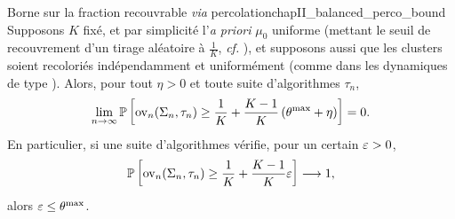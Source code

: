 \begin{Theoreme}{Borne sur la fraction recouvrable \emph{via} percolation}{chapII_balanced_perco_bound}
Supposons $K$ fixé, et par simplicité l'\emph{a priori} $\mu_0$ uniforme (mettant le seuil de recouvrement d'un tirage aléatoire à $\frac1K$, \emph{cf.} ), et supposons aussi que les clusters soient recoloriés indépendamment et uniformément (comme dans les dynamiques de type \SW{}). Alors, pour tout $\eta>0$ et toute suite d'algorithmes $\tau_n$,
\begin{equation}
    \lim_{n\to\infty}
    \mathbb P\left[
        \operatorname{ov}_n(\Sigma_n,\tau_n)
        \ge
        \frac1K+\frac{K-1}{K}\left(\theta^{\max}+\eta\right)
    \right]
    =0.
    \label{eq:chapII_balanced_perco_bound_proba}
\end{equation}
En particulier, si une suite d'algorithmes vérifie, pour un certain $\varepsilon>0$,
\begin{equation}
    \mathbb P\left[
        \operatorname{ov}_n(\Sigma_n,\tau_n)
        \ge
        \frac1K+\frac{K-1}{K}\varepsilon
    \right]\longrightarrow1,
    \label{eq:chapII_eps_recovery}
\end{equation}
alors $\varepsilon\le \theta^{\max}$. 
\end{Theoreme}

